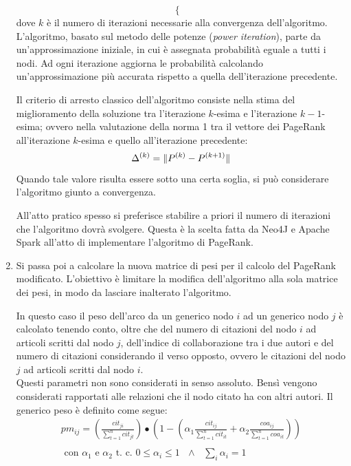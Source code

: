 \documentclass[a4paper, 12pt]{article}
\newcommand{\citazioni}{cit}
\newcommand{\coautori}{coa}
\newcommand{\altroindice}{t}
\begin{document}
\begin{enumerate}
\begin{equation}
\begin{cases}
    \end{cases} 
  \end{equation}
  dove $ k $ è il numero di iterazioni necessarie alla convergenza dell'algoritmo. L'algoritmo, basato sul metodo delle potenze (\textit{power iteration}), parte da un'approssimazione iniziale, in cui è assegnata probabilità eguale a tutti i nodi. Ad ogni iterazione aggiorna le probabilità calcolando un'approssimazione più accurata rispetto a quella dell'iterazione precedente.
  \par
  Il criterio di arresto classico dell'algoritmo consiste nella stima del miglioramento della soluzione tra l'iterazione $k$-esima e l'iterazione $k-1$-esima; ovvero nella valutazione della norma 1 tra il vettore dei PageRank all'iterazione $k$-esima e quello all'iterazione precedente:
  \begin{equation*}
    \Delta^{(k)} = \Arrowvert P^{(k)} - P^{(k+1)}\Arrowvert
  \end{equation*}
  Quando tale valore risulta essere sotto una certa soglia, si può considerare l'algoritmo giunto a convergenza.
  \par
  All'atto pratico spesso si preferisce stabilire a priori il numero di iterazioni che l'algoritmo dovrà svolgere. Questa è la scelta fatta da Neo4J e Apache Spark all'atto di implementare l'algoritmo di PageRank.
  \item
  Si passa poi a calcolare la nuova matrice di pesi per il calcolo del PageRank modificato. L'obiettivo è limitare la modifica dell'algoritmo alla sola matrice dei pesi, in modo da lasciare inalterato l'algoritmo.
  \par
  In questo caso il peso dell'arco da un generico nodo $i$ ad un generico nodo $j$ è calcolato tenendo conto, oltre che del numero di citazioni del nodo $i$ ad articoli scritti dal nodo $j$, dell'indice di collaborazione tra i due autori e del numero di citazioni considerando il verso opposto, ovvero le citazioni del nodo $j$ ad articoli scritti dal nodo $i$. \\
  Questi parametri non sono considerati in senso assoluto. Bensì vengono considerati rapportati alle relazioni che il nodo citato ha con altri autori.
  Il generico peso è definito come segue:
  \begin{equation}
  \begin{split}
    pm_{ij} = 
    \left( 
      \frac
      {\displaystyle \citazioni_{ji}}
      {\displaystyle \sum_{\altroindice=1}^{n} {\citazioni_{j\altroindice}}}
    \right)
    \bullet
    \left(
      1 - 
      \left(
      \alpha_1
      \frac
      {\displaystyle \citazioni_{ij}}
      {\displaystyle \sum_{\altroindice=1}^{n} {\citazioni_{i\altroindice}}}
      +
      \alpha_2
      \frac
      {\displaystyle \coautori_{ij}}
      {\displaystyle \sum_{\altroindice=1}^{n} {\coautori_{i\altroindice}}}
      \right)
    \right) \\ \\
    \text{ con }
    \alpha_1 \text{ e }  \alpha_2 \text{  t. c. } 0 \leq \alpha_i \leq 1 \text{ } \wedge \text{ } \sum_i {\alpha_i} = 1
  \end{split}
  \end{equation} 
      

\end{enumerate}
\end{document}
